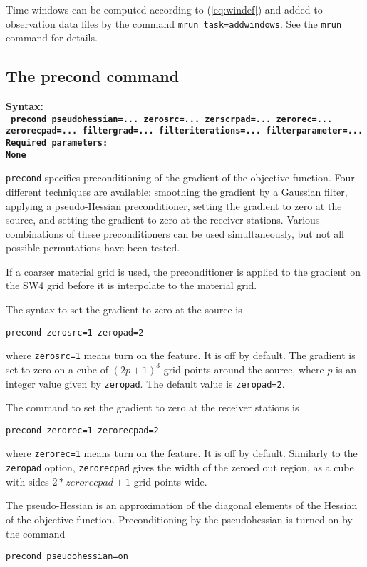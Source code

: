 \documentclass[12pt]{report}
\begin{document}
Time windows can be computed according to (\ref{eq:windef}) and added to observation data files
by the command {\tt mrun task=addwindows}. See the {\tt mrun} command for details.

\subsection{The precond command}\label{sec:precond}
\begin{flushleft}\bf
Syntax:\\
\tt
precond pseudohessian=... zerosrc=... zerscrpad=... zerorec=... zerorecpad=... filtergrad=... 
filteriterations=... filterparameter=...
\\
\bf Required parameters:\\
\rm
None
\end{flushleft}
{\tt precond} specifies preconditioning of the gradient of the objective function. 
Four different techniques are available: smoothing the gradient by a Gaussian filter, 
applying a pseudo-Hessian preconditioner, setting the gradient to zero at the source, 
and setting the gradient to zero at the receiver stations. Various combinations of 
these preconditioners can be used simultaneously, but not all possible permutations 
have been tested.
\par
If a coarser material grid is used, the preconditioner is applied to the gradient
on the SW4 grid before it is interpolate to the material grid. 

The syntax to set the gradient to zero at the source is
\begin{verbatim}
precond zerosrc=1 zeropad=2
\end{verbatim}
where {\tt zerosrc=1} means turn on the feature. It is off by default. The gradient is
set to zero on a cube of $(2p+1)^3$ grid points around the source,
where $p$ is an integer value given by {\tt zeropad}. The default value is {\tt zeropad=2}.

The command to set the gradient to zero at the receiver stations is
\begin{verbatim}
precond zerorec=1 zerorecpad=2
\end{verbatim}
where {\tt zerorec=1} means turn on the feature. It is off by default. 
Similarly to the {\tt zeropad} option, {\tt zerorecpad} gives the width of
the zeroed out region, as a cube with sides $2*zerorecpad+1$ grid points wide.

The pseudo-Hessian is an approximation of the diagonal elements of the Hessian
of the objective function. Preconditioning by the pseudohessian is turned on
by the command
\begin{verbatim}
precond pseudohessian=on
\end{verbatim}
\end{document}
